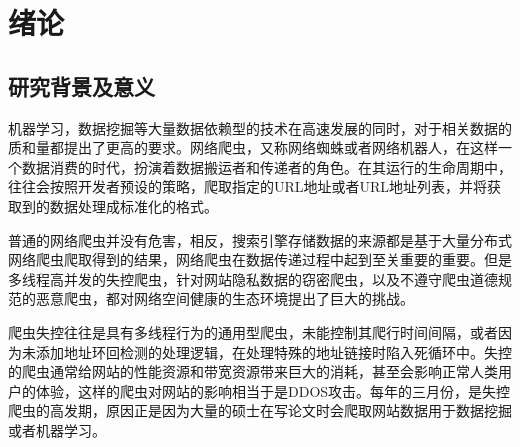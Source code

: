 \documentclass[doctor,privacy,twoside]{buaa_mac}
\begin{document}



\chapter{绪论}


\section{研究背景及意义}
机器学习，数据挖掘等大量数据依赖型的技术在高速发展的同时，对于相关数据的质和量都提出了更高的要求。网络爬虫，又称网络蜘蛛或者网络机器人，在这样一个数据消费的时代，扮演着数据搬运者和传递者的角色。在其运行的生命周期中，往往会按照开发者预设的策略，爬取指定的URL地址或者URL地址列表，并将获取到的数据处理成标准化的格式。

普通的网络爬虫并没有危害，相反，搜索引擎存储数据的来源都是基于大量分布式网络爬虫爬取得到的结果，网络爬虫在数据传递过程中起到至关重要的重要。但是多线程高并发的失控爬虫，针对网站隐私数据的窃密爬虫，以及不遵守爬虫道德规范的恶意爬虫，都对网络空间健康的生态环境提出了巨大的挑战。

爬虫失控往往是具有多线程行为的通用型爬虫，未能控制其爬行时间间隔，或者因为未添加地址环回检测的处理逻辑，在处理特殊的地址链接时陷入死循环中。失控的爬虫通常给网站的性能资源和带宽资源带来巨大的消耗，甚至会影响正常人类用户的体验，这样的爬虫对网站的影响相当于是DDOS攻击。每年的三月份，是失控爬虫的高发期，原因正是因为大量的硕士在写论文时会爬取网站数据用于数据挖掘或者机器学习。
\end{document}
